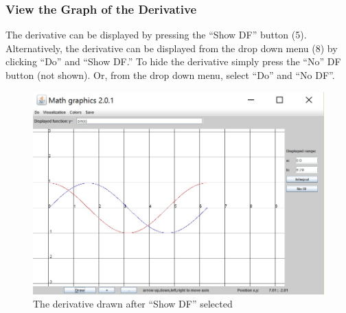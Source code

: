 \documentclass{article}[12 pt]
\begin{document}
		 	\subsubsection{View the Graph of the Derivative}
 			The derivative can be displayed by pressing the ``Show DF'' button (5). Alternatively, the derivative can be displayed from the drop down menu (8) by clicking ``Do'' and ``Show DF.'' To hide the derivative simply press the ``No'' DF button (not shown). Or, from the drop down menu, select ``Do'' and ``No DF''.
 				\begin{figure}[h!]
 					\centering
 					\includegraphics[scale = .75]{showDF}
					\caption{The derivative drawn after ``Show DF'' selected}
 				\end{figure}	
			
			\pagebreak
\end{document}

